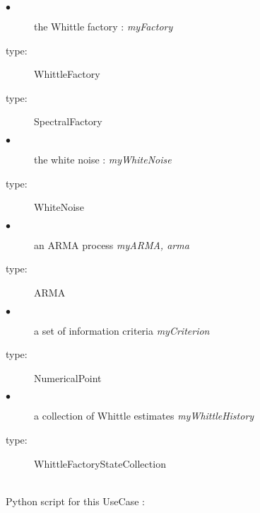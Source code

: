 {
  \begin{description}
  \item[$\bullet$] the Whittle factory : {\itshape myFactory}
  \item[type:]  WhittleFactory
  \end{description}

  \begin{description}
  \item[type:]  SpectralFactory
  \end{description}

  \begin{description}
  \item[$\bullet$] the white noise : {\itshape myWhiteNoise}
  \item[type:]  WhiteNoise
  \end{description}

  \begin{description}
  \item[$\bullet$] an ARMA process {\itshape myARMA, arma}
  \item[type:]  ARMA
  \end{description}

  \begin{description}
  \item[$\bullet$] a set of information criteria {\itshape myCriterion}
  \item[type:]  NumericalPoint
  \end{description}

  \begin{description}
  \item[$\bullet$] a collection of Whittle estimates {\itshape myWhittleHistory}
  \item[type:]  WhittleFactoryStateCollection
  \end{description}

}

\textspace\\
Python script for this UseCase :

